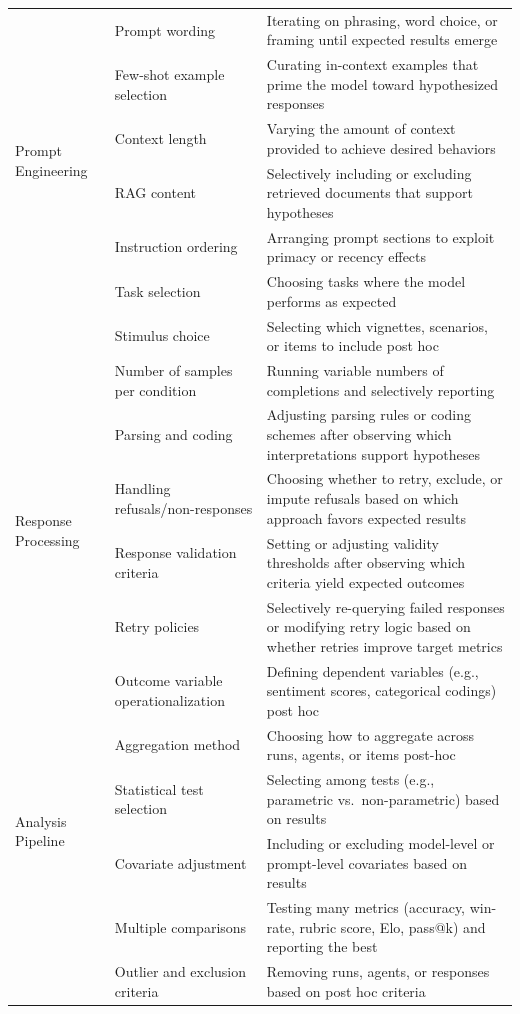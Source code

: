 \documentclass{article}
\theoremstyle{plain}
\theoremstyle{definition}
\theoremstyle{remark}
\begin{document}
\begin{table}[htp]
\begin{tabularx}{\textwidth}{@{}p{3cm}p{3.2cm}X@{}}
\multirow{6}{*}{\parbox{2.4cm}{Prompt Engineering}} 
 & Prompt wording & Iterating on phrasing, word choice, or framing until expected results emerge \\[0.5em]
 & Few-shot example selection & Curating in-context examples that prime the model toward hypothesized responses \\[0.5em]
 & Context length & Varying the amount of context provided to achieve desired behaviors \\[0.5em]
 & RAG content & Selectively including or excluding retrieved documents that support hypotheses \\[0.5em]
 & Instruction ordering & Arranging prompt sections to exploit primacy or recency effects \\
\midrule

\multirow{3}{*}{\parbox{2.4cm}{Experimental Design}} 
 & Task selection & Choosing tasks where the model performs as expected \\[0.5em]
 & Stimulus choice & Selecting which vignettes, scenarios, or items to include post hoc \\[0.5em]
 & Number of samples per condition & Running variable numbers of completions and selectively reporting \\
\midrule

\multirow{4}{*}{\parbox{2.4cm}{Response Processing}} 
 & Parsing and coding & Adjusting parsing rules or coding schemes after observing which interpretations support hypotheses \\[0.5em]
 & Handling refusals/non-responses & Choosing whether to retry, exclude, or impute refusals based on which approach favors expected results \\[0.5em]
 & Response validation criteria & Setting or adjusting validity thresholds after observing which criteria yield expected outcomes \\[0.5em]
 & Retry policies & Selectively re-querying failed responses or modifying retry logic based on whether retries improve target metrics \\
\midrule

\multirow{7}{*}{\parbox{2.4cm}{Analysis Pipeline}} 
 & Outcome variable operationalization & Defining dependent variables (e.g., sentiment scores, categorical codings) post hoc \\[0.5em]
 & Aggregation method & Choosing how to aggregate across runs, agents, or items post-hoc \\[0.5em]
 & Statistical test selection & Selecting among tests (e.g., parametric vs.\ non-parametric) based on results \\[0.5em]
 & Covariate adjustment & Including or excluding model-level or prompt-level covariates based on results \\[0.5em]
 & Multiple comparisons & Testing many metrics (accuracy, win-rate, rubric score, Elo, pass@k) and reporting the best \\[0.5em]
 & Outlier and exclusion criteria & Removing runs, agents, or responses based on post hoc criteria \\
\midrule


\end{tabularx}
\end{table}
\end{document}
